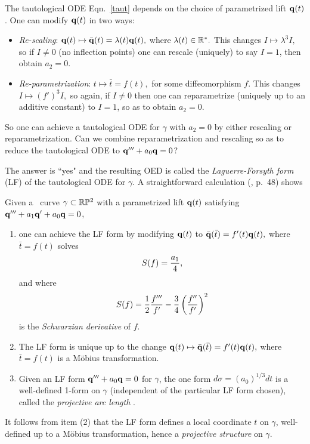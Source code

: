 The tautological ODE Eqn.~\eqref{taut} depends on the  choice of parametrized lift  $\mathbf q(t)$. One can modify  $\mathbf q(t) $ in two ways:
\begin{itemize}

\item {\em Re-scaling}:  $\mathbf q(t) \mapsto \bar{\mathbf q}(t)=\lambda(t) \mathbf q(t) ,$ where $ \lambda(t) \in \mathbb{R}^*.$ This changes 
$I\mapsto\lambda^3I,$ so if $I\neq 0$ (no inflection points) one  can rescale (uniquely)  to say $I=1$, 
then obtain $a_2= 0$.  
\item {\em Re-parametrization}: $ t\mapsto \bar  t=f(t),$ for some diffeomorphism  $f$. This changes $I\mapsto (f')^3I,$ so again, if $I\neq 0$ then one can reparametrize (uniquely up to an additive constant) to $I=1$, so as to obtain $a_2=0$. 

 \end{itemize}
 So one can achieve a tautological ODE for $\gamma$ with $a_2=0$ by either rescaling or reparametrization. 
Can we combine reparametrization and rescaling so as to reduce the tautological ODE to  $\mathbf q'''+a_0\mathbf q=0$?


The answer is ``yes" and the resulting OED is called  the  {\em Laguerre-Forsyth  form}   (LF) of the tautological 
ODE for $\gamma$. A straightforward calculation (\cite{Cbook}, p.~48) 
shows 

\begin{proposition}\label{TwentyOne} Given a \lc\ curve $\gamma\subset\mathbb{R}\mathbb{P}^2$ with  a parametrized lift $\mathbf q(t)$ satisfying $\mathbf q'''+a_1\mathbf q'+a_0\mathbf q=0$,

\sn\begin{enumerate}[leftmargin=30pt,label=(\arabic*)]\setlength\itemsep{5pt}

\item one  can achieve the LF form by modifying  $\mathbf q(t)$ to  $\bar {\mathbf q}(\bar  t)= f'(t)\mathbf q(t),$ where $\bar  t=f(t)$ solves
 $$S(f)={a_1\over 4},$$
and  where $$S(f)={1\over 2}{f'''\over f'}-{3\over 4}\left({f''\over f'}\right)^2$$
 is the {\em Schwarzian derivative} of $f$. 
 
\item The LF form is unique  up to the  change $\mathbf q(t)\mapsto \bar {\mathbf q}(\bar  t)= f'(t)\mathbf q(t),$ where $\bar  t=f(t)$ is a M\"obius transformation. 

\item Given an LF form $\mathbf q'''+a_0\mathbf q=0$  for $\gamma$, the  one form $d\sigma=(a_0)^{1/3}dt$ is a well-defined 1-form on $\gamma$ (independent of the particular LF form chosen), called the {\em projective arc length} \cite[p.~50]{Cbook}.

\end{enumerate} 

\end{proposition}
%
It follows from  item (2) that the LF form defines a local coordinate $t$ on $\gamma$, well-defined up to a M\"obius transformation, hence a {\em projective structure}  on  $\gamma$.

